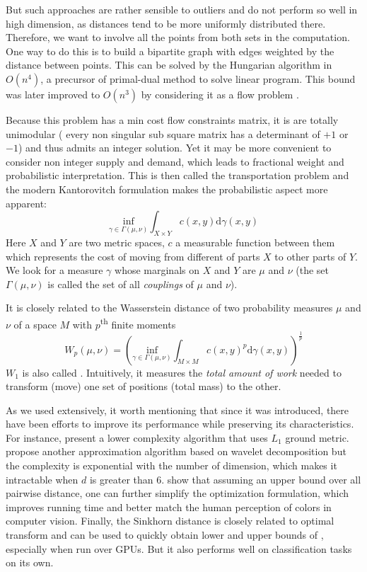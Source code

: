 But such approaches are rather sensible to outliers and do not perform so well
in high dimension, as distances tend to be more uniformly distributed there.
Therefore, we want to involve all the points from both sets in the computation.
One way to do this is to build a bipartite graph with edges weighted by the
distance between points. This can be solved by the Hungarian algorithm
\autocite{Hungarian57} in $O(n^4)$, a precursor of primal-dual method to solve
linear program. This bound was later improved to $O(n^3)$ by considering it as
a flow problem \autocite{HungarianN372}.

Because this problem has a min cost flow constraints matrix, it is are totally
unimodular (\ie{} every non singular sub square matrix has a determinant of
$+1$ or $-1$) and thus admits an integer solution. Yet it may be more convenient
to consider non integer supply and demand, which leads to fractional weight and
probabilistic interpretation. This is then called the transportation problem
and the modern Kantorovitch formulation makes the probabilistic aspect more
apparent:
\begin{equation*}
 \underset{\gamma \in \Gamma(\mu, \nu)}{\mathrm{inf}}
 \int_{X\times Y} c(x,y)\mathrm{d}\gamma(x,y)
\end{equation*}
Here $X$ and $Y$ are two metric spaces, $c$ a measurable function between them
which represents the cost of moving from different of parts $X$ to other parts of $Y$.
We look for a measure $\gamma$ whose marginals on $X$ and $Y$ are $\mu$ and
$\nu$ (the set $\Gamma(\mu, \nu)$ is called the set of all \emph{couplings} of
$\mu$ and $\nu$).

It is closely related to the Wasserstein distance of
two probability measures $\mu$ and $\nu$ of a space $M$ with
$p$\textsuperscript{th} finite moments
\begin{equation*}
W_p(\mu, \nu) = \left( \underset{\gamma \in \Gamma(\mu, \nu)}{\mathrm{inf}}
\int_{M\times M} c(x,y)^p\mathrm{d}\gamma(x,y)\right)^{\frac{1}{p}}
\end{equation*}
$W_1$ is also called  \autocite{EMD98}.
Intuitively, it measures the {\em total amount of work} needed to transform
(move) one set of positions (total mass) to the other. 


As we used \emd{} extensively, it worth mentioning that since it was
introduced, there have been efforts to improve its performance while preserving
its characteristics. For instance, \textcite{Ling2007} present a lower
complexity algorithm that uses $L_1$ ground metric. \Textcite{Shirdhonkar2008}
propose another approximation algorithm based on wavelet decomposition but the
complexity is exponential with the number of dimension, which makes it
intractable when $d$ is greater than 6. \Textcite{Pele2009} show that assuming
an upper bound over all pairwise distance, one can further simplify the
optimization formulation, which improves running time and better match the
human perception of colors in computer vision. Finally, the Sinkhorn distance
\autocite{FastEMD13} is closely related to optimal transform and can be used to
quickly obtain lower and upper bounds of \emd{}, especially when run over GPUs.
But it also performs well on classification tasks on its own.

